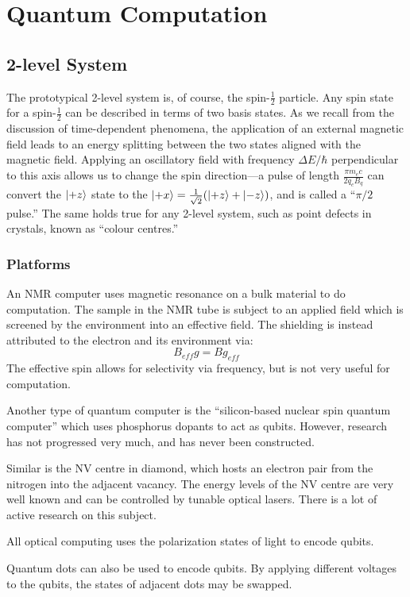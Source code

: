 \chapter{Quantum Computation}
\section{2-level System}
The prototypical 2-level system is, of course, the spin-\(\frac{1}{2}\) particle. Any spin state for a spin-\(\frac{1}{2}\) can be described in terms of two basis states. As we recall from the discussion of time-dependent phenomena, the application of an external magnetic field leads to an energy splitting between the two states aligned with the magnetic field. Applying an oscillatory field with frequency \(\Delta E/\hbar\) perpendicular to this axis allows us to change the spin direction---a pulse of length \(\frac{\pi m_e c}{2q_e B_q}\) can convert the \(\lvert+z\rangle\) state to the \(\lvert+x\rangle=\frac{1}{\sqrt{2}}(\lvert+z\rangle+\lvert-z\rangle)\), and is called a ``\(\pi/2\) pulse.'' The same holds true for any 2-level system, such as point defects in crystals, known as ``colour centres.''

\subsection{Platforms}
An NMR computer uses magnetic resonance on a bulk material to do computation. The sample in the NMR tube is subject to an applied field which is screened by the environment into an effective field. The shielding is instead attributed to the electron and its environment via:
\[B_{eff} g = Bg_{eff}\]
The effective spin allows for selectivity via frequency, but is not very useful for computation.

Another type of quantum computer is the ``silicon-based nuclear spin quantum computer'' which uses phosphorus dopants to act as qubits. However, research has not progressed very much, and has never been constructed.

Similar is the NV centre in diamond, which hosts an electron pair from the nitrogen into the adjacent vacancy. The energy levels of the NV centre are very well known and can be controlled by tunable optical lasers. There is a lot of active research on this subject.

All optical computing uses the polarization states of light to encode qubits. 

Quantum dots can also be used to encode qubits. By applying different voltages to the qubits, the states of adjacent dots may be swapped. 

